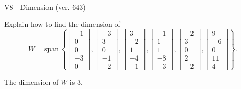 \begin{exercise}
  \begin{exerciseTitle}V8 - Dimension (ver. 643)\end{exerciseTitle}
  \begin{exerciseStatement}
    Explain how to find the dimension of 
\[W=\mathrm{span}\ \left\{\left[\begin{array}{r}
-1 \\
0 \\
0 \\
-3 \\
0
\end{array}\right] , \left[\begin{array}{r}
-3 \\
3 \\
0 \\
-1 \\
-2
\end{array}\right] , \left[\begin{array}{r}
3 \\
-2 \\
1 \\
-4 \\
-1
\end{array}\right] , \left[\begin{array}{r}
-1 \\
1 \\
1 \\
-8 \\
-3
\end{array}\right] , \left[\begin{array}{r}
-2 \\
3 \\
0 \\
2 \\
-2
\end{array}\right] , \left[\begin{array}{r}
9 \\
-6 \\
0 \\
11 \\
4
\end{array}\right]\right\}.\]



  \end{exerciseStatement}
  \begin{exerciseAnswer}
   The dimension of \(W\) is  \(3\).
  


  \end{exerciseAnswer}
\end{exercise}